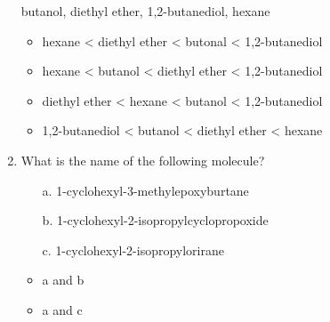 \documentclass[12pt,a4paper]{article}
\begin{document}
\begin{enumerate}
    butanol, diethyl ether, 1,2-butanediol, hexane
    \begin{itemize}
        \item {\color{o-Sun}hexane < diethyl ether < butonal < 1,2-butanediol}
        \item hexane < butanol < diethyl ether < 1,2-butanediol
        \item diethyl ether < hexane < butanol < 1,2-butanediol
        \item 1,2-butanediol < butanol < diethyl ether < hexane
    \end{itemize}
    \item What is the name of the following molecule?


    \begin{itemize}
        \item[a.] 1-cyclohexyl-3-methylepoxyburtane
        \item[b.] 1-cyclohexyl-2-isopropylcyclopropoxide
        \item[c.] {\color{o-Sun}1-cyclohexyl-2-isopropylorirane}
        \item a and b
        \item a and c
    \end{itemize}
\end{enumerate}

\newpage
{}
\end{document}
